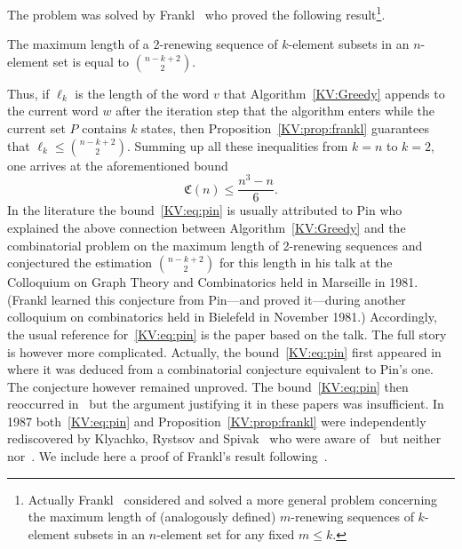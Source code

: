 \documentclass{irmaart}
\theoremstyle{plain}
\begin{document}
The problem was solved by Frankl~\cite{Frankl:1982} who proved the following
result\footnote{Actually Frankl~\cite{Frankl:1982} considered and solved a more
general problem concerning the maximum length of (analogously defined)
$m$-renewing sequences of $k$-element subsets in an $n$-element set for any
fixed $m\le k$.}.
\begin{proposition}
\label{KV:prop:frankl} The maximum length of a $2$-renewing sequence of
$k$-element subsets in an $n$-element set is equal to $\binom{n-k+2}2$.
\end{proposition}
Thus, if $\ell_k$ is the length of the word $v$ that Algorithm~\ref{KV:Greedy}
appends to the current word $w$ after the iteration step that the algorithm
enters while the current set $P$ contains $k$ states, then
Proposition~\ref{KV:prop:frankl} guarantees that $\ell_k\le\binom{n-k+2}2$.
Summing up all these inequalities from $k=n$ to $k=2$, one arrives at the
aforementioned bound
\begin{equation}
\label{KV:eq:pin} \mathfrak{C}(n)\le\dfrac{n^3-n}6.
\end{equation}
In the literature the bound~\eqref{KV:eq:pin} is usually attributed to Pin who
explained the above connection between Algorithm~\ref{KV:Greedy} and the
combinatorial problem on the maximum length of 2-renewing sequences and
conjectured the estimation $\binom{n-k+2}2$ for this length in his talk at the
Colloquium on Graph Theory and Combinatorics held in Marseille in 1981. (Frankl
learned this conjecture from Pin---and proved it---during another colloquium on
combinatorics held in Bielefeld in November 1981.) Accordingly, the usual
reference for~\eqref{KV:eq:pin} is the paper \cite{Pin:1983} based on the talk.
The full story is however more complicated. Actually, the
bound~\eqref{KV:eq:pin} first appeared in~\cite{Fischler&Tannenbaum:1970} where
it was deduced from a combinatorial conjecture equivalent to Pin's one. The
conjecture however remained unproved. The bound~\eqref{KV:eq:pin} then
reoccurred in~\cite{Kohavi&Winograd:1971,Kohavi&Winograd:1973} but the argument
justifying it in these papers was insufficient. In 1987 both~\eqref{KV:eq:pin}
and Proposition~\ref{KV:prop:frankl} were independently rediscovered by
Klyachko, Rystsov and Spivak~\cite{Klyachko&Rystsov&Spivak:1987} who were aware
of~\cite{Fischler&Tannenbaum:1970,Kohavi&Winograd:1971,Kohavi&Winograd:1973}
but
neither~\cite{Pin:1983} nor~\cite{Frankl:1982}. We include here a proof of Frankl's result
following~\cite{Klyachko&Rystsov&Spivak:1987}.
\end{document}
